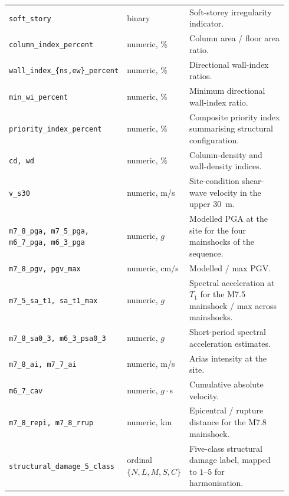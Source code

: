 \documentclass[11pt,a4paper]{article}
\begin{document}
\begin{longtable}{
>{\scriptsize\ttfamily\RaggedRight\arraybackslash}p{0.34\linewidth}
p{0.18\linewidth}
p{0.42\linewidth}
}
\texttt{soft\_story}                           & binary                  & Soft-storey irregularity indicator. \\
\texttt{column\_index\_percent}                & numeric, \%             & Column area / floor area ratio. \\
\texttt{wall\_index\_\{ns,ew\}\_percent}       & numeric, \%             & Directional wall-index ratios. \\
\texttt{min\_wi\_percent}                      & numeric, \%             & Minimum directional wall-index ratio. \\
\texttt{priority\_index\_percent}              & numeric, \%             & Composite priority index summarising structural configuration. \\
\texttt{cd, wd}                                & numeric, \%             & Column-density and wall-density indices. \\
\texttt{v\_s30}                                & numeric, m/s            & Site-condition shear-wave velocity in the upper 30~m. \\
\texttt{m7\_8\_pga, m7\_5\_pga, m6\_7\_pga, m6\_3\_pga} & numeric, $g$   & Modelled PGA at the site for the four mainshocks of the sequence. \\
\texttt{m7\_8\_pgv, pgv\_max}                  & numeric, cm/s           & Modelled / max PGV. \\
\texttt{m7\_5\_sa\_t1, sa\_t1\_max}            & numeric, $g$            & Spectral acceleration at $T_1$ for the M7.5 mainshock / max across mainshocks. \\
\texttt{m7\_8\_sa0\_3, m6\_3\_psa0\_3}         & numeric, $g$            & Short-period spectral acceleration estimates. \\
\texttt{m7\_8\_ai, m7\_7\_ai}                  & numeric, m/s            & Arias intensity at the site. \\
\texttt{m6\_7\_cav}                            & numeric, $g\cdot$s      & Cumulative absolute velocity. \\
\texttt{m7\_8\_repi, m7\_8\_rrup}              & numeric, km             & Epicentral / rupture distance for the M7.8 mainshock. \\
\texttt{structural\_damage\_5\_class}          & ordinal $\{N,L,M,S,C\}$ & Five-class structural damage label, mapped to $1$--$5$ for harmonisation. \\
\bottomrule
\end{longtable}

\end{document}

